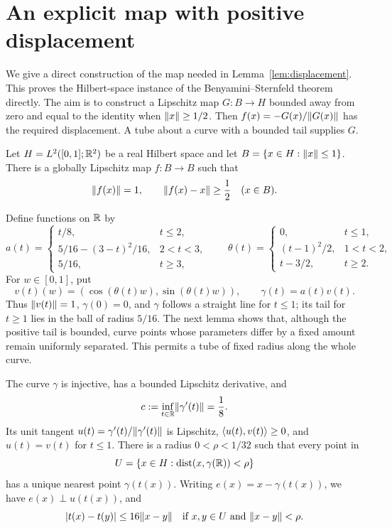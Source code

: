 \section{An explicit map with positive displacement}\label{app:auxiliary}

We give a direct construction of the map needed in
Lemma~\ref{lem:displacement}. This proves the Hilbert-space instance of
the Benyamini--Sternfeld theorem~\cite{BenyaminiSternfeld1983} directly.
The aim is to construct a Lipschitz map
$G:B\to H$ bounded away from zero and equal to the identity when
$\lVert x\rVert\ge1/2$. Then $f(x)=-G(x)/\lVert G(x)\rVert$ has the required
displacement. A tube about a curve with a bounded tail supplies $G$.

\begin{proposition}\label{aux:map}
Let $H=L^2([0,1];\mathbb R^2)$ be a real Hilbert space and let
$B=\{x\in H:\lVert x\rVert\le1\}$. There is a globally Lipschitz map $f:B\to B$
such that
\[
  \lVert f(x)\rVert=1,
  \qquad \lVert f(x)-x\rVert\ge\frac12
  \quad(x\in B).
\]
\end{proposition}

Define functions on $\mathbb R$ by
\[
 a(t)=
 \begin{cases}
 t/8,&t\le2,\\
 5/16-(3-t)^2/16,&2<t<3,\\
 5/16,&t\ge3,
 \end{cases}
 \qquad
 \theta(t)=
 \begin{cases}
 0,&t\le1,\\
 (t-1)^2/2,&1<t<2,\\
 t-3/2,&t\ge2.
 \end{cases}
\]
For $w\in[0,1]$, put
\[
 v(t)(w)=(\cos(\theta(t)w),\sin(\theta(t)w)),
 \qquad \gamma(t)=a(t)v(t).
\]
Thus $\lVert v(t)\rVert=1$, $\gamma(0)=0$, and $\gamma$ follows a straight line
for $t\le1$; its tail for $t\ge1$ lies in the ball of radius $5/16$.
The next lemma shows that, although the positive tail is bounded, curve
points whose parameters differ by a fixed amount remain uniformly
separated. This permits a tube of fixed radius along the whole curve.

\begin{lemma}\label{aux:tube}
The curve $\gamma$ is injective, has a bounded Lipschitz derivative, and
\[
 c:=\inf_{t\in\mathbb R}\lVert \gamma'(t)\rVert=\frac18.
\]
Its unit tangent $u(t)=\gamma'(t)/\lVert \gamma'(t)\rVert$ is Lipschitz,
$\langle u(t),v(t)\rangle\ge0$, and $u(t)=v(t)$ for $t\le1$.
There is a radius $0<\rho<1/32$ such that every point in
\[
 U=\{x\in H:\operatorname{dist}(x,\gamma(\mathbb R))<\rho\}
\]
has a unique nearest point $\gamma(t(x))$. Writing
$e(x)=x-\gamma(t(x))$, we have $e(x)\perp u(t(x))$, and
\begin{equation}\label{aux:parameter}
 |t(x)-t(y)|\le16\lVert x-y\rVert
 \quad\text{if }x,y\in U\text{ and }\lVert x-y\rVert<\rho.
\end{equation}
\end{lemma}

